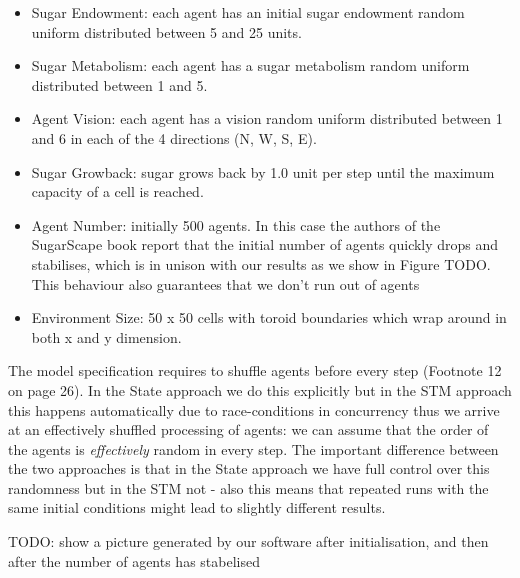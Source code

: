 \begin{itemize}
	\item Sugar Endowment: each agent has an initial sugar endowment random uniform distributed between 5 and 25 units.
	\item Sugar Metabolism: each agent has a sugar metabolism random uniform distributed between 1 and 5.
	\item Agent Vision: each agent has a vision random uniform distributed between 1 and 6 in each of the 4 directions (N, W, S, E). 
	\item Sugar Growback: sugar grows back by 1.0 unit per step until the maximum capacity of a cell is reached.
	\item Agent Number: initially 500 agents. In this case the authors of the SugarScape book report that the initial number of agents quickly drops and stabilises, which is in unison with our results as we show in Figure TODO. This behaviour also guarantees that we don't run out of agents
	\item Environment Size: 50 x 50 cells with toroid boundaries which wrap around in both x and y dimension.
\end{itemize}

The model specification requires to shuffle agents before every step (Footnote 12 on page 26). In the State approach we do this explicitly but in the STM approach this happens automatically due to race-conditions in concurrency thus we arrive at an effectively shuffled processing of agents: we can assume that the order of the agents is \textit{effectively} random in every step. The important difference between the two approaches is that in the State approach we have full control over this randomness but in the STM not - also this means that repeated runs with the same initial conditions might lead to slightly different results.

TODO: show a picture generated by our software after initialisation, and then after the number of agents has stabelised

